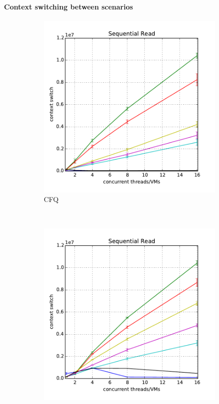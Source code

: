 \documentclass{acmsig}
\begin{document}
\paragraph{Context switching between scenarios}

\begin{figure}[t]
   \centering
   \begin{subfigure}[b]{0.3\textwidth}
     \includegraphics[width=\textwidth]{figures/contextswitching_cfq_read.pdf}
     \caption{CFQ}
     \label{fig:contextswitching_cfq_read}
   \end{subfigure}%
   ~ %
   \begin{subfigure}[b]{0.3\textwidth}
     \includegraphics[width=\textwidth]{figures/contextswitching_deadline_read.pdf}

\end{subfigure}
\end{figure}
\end{document}
